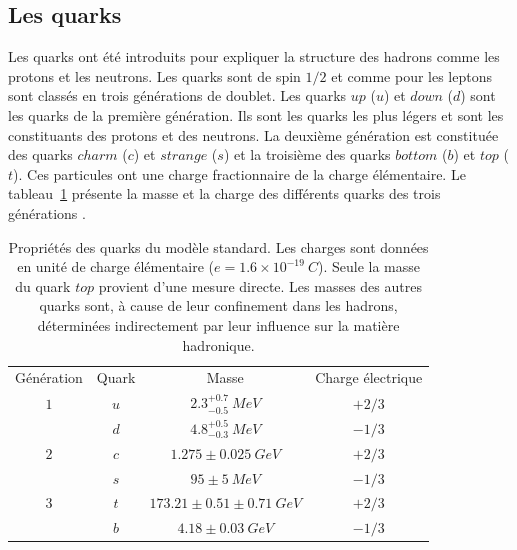 \subsection{Les quarks}
Les quarks ont été introduits pour expliquer la structure des hadrons comme les protons et les neutrons. Les quarks sont de spin $1/2$ et comme pour les leptons sont classés en trois générations de doublet. Les quarks $up$ ($u$) et $down$ ($d$) sont les quarks de la première génération. Ils sont les quarks les plus légers et sont les constituants des protons et des neutrons. La deuxième génération est constituée des quarks $charm$ ($c$) et $strange$ ($s$) et la troisième des quarks $bottom$ ($b$) et $top$ ($t$). Ces particules ont une charge fractionnaire de la charge élémentaire. Le tableau~\ref{tab.quark_pro} présente la masse et la charge des différents quarks des trois générations \cite{pdg}. 
\begin{table}[!ht]
  \begin{center}
    \begin{tabular}{c|c|c|c}
      \rowcolor{black!20!white}Génération & Quark & Masse & Charge électrique\\
      \rowcolor{black!5!white}\hline
      \rowcolor{black!5!white}$1$ & $u$ & $2.3^{+0.7}_{-0.5}~MeV$ & $+2/3$ \\
      \rowcolor{black!5!white}$ $ & $d$ & $4.8^{+0.5}_{-0.3}~MeV$ & $-1/3$ \\
      \rowcolor{black!5!white}\hline
      \rowcolor{black!5!white}$2$ & $c$ & $1.275\pm0.025~GeV$ & $+2/3$ \\
      \rowcolor{black!5!white}$ $ & $s$ & $95\pm5~MeV$ & $-1/3$ \\
      \rowcolor{black!5!white}\hline
      \rowcolor{black!5!white}$3$ & $t$ & $173.21\pm0.51\pm0.71~GeV$ & $+2/3$ \\
      \rowcolor{black!5!white}$ $ & $b$ & $4.18\pm0.03~GeV$ & $-1/3$ \\
    \end{tabular}
  \end{center}  
  \caption{Propriétés des quarks du modèle standard. Les charges sont données en unité de charge élémentaire ($e=1.6\times10^{-19}~C$). Seule la masse du quark $top$ provient d'une mesure directe. Les masses des autres quarks sont, à cause de leur confinement dans les hadrons, déterminées indirectement par leur influence sur la matière hadronique.}
  \label{tab.quark_pro}
\end{table}
